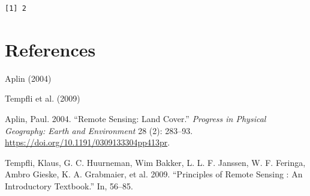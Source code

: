 \documentclass[
  letterpaper,
  DIV=11,
  numbers=noendperiod]{scrreprt}
\newlength{\cslhangindent}
\newlength{\cslentryspacingunit} %
\newenvironment{CSLReferences}[2] %
 {%
  \setlength{\parindent}{0pt}
  \ifodd #1
  \let\oldpar\par
  \def\par{\hangindent=\cslhangindent\oldpar}
  \fi
  \setlength{\parskip}{#2\cslentryspacingunit}
 }%
 {}
\begin{document}
\begin{verbatim}
[1] 2
\end{verbatim}


\hypertarget{references}{%
\chapter*{References}\label{references}}


\leavevmode{}%
\begin{CSLReferences}{1}{0}
Aplin (2004)

Tempfli et al. (2009)

\leavevmode{}%
Aplin, Paul. 2004. {``Remote Sensing: Land Cover.''} \emph{Progress in
Physical Geography: Earth and Environment} 28 (2): 283--93.
\url{https://doi.org/10.1191/0309133304pp413pr}.

\leavevmode{}%
Tempfli, Klaus, G. C. Huurneman, Wim Bakker, L. L. F. Janssen, W. F.
Feringa, Ambro Gieske, K. A. Grabmaier, et al. 2009. {``Principles of
Remote Sensing : An Introductory Textbook.''} In, 56--85.

\end{CSLReferences}
\end{document}
